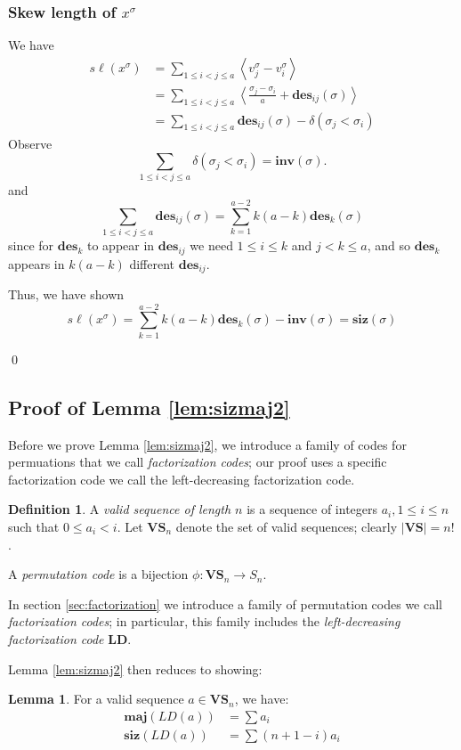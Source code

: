 \documentclass{amsart}[12pt]
\theoremstyle{definition}
\newtheorem{lemma}[dummy]{Lemma}
\newtheorem{definition}[dummy]{Definition}
\newcommand{\sk}{s\ell}
\newcommand{\inv}{\mathbf{inv}}
\newcommand{\des}{\mathbf{des}}
\newcommand{\maj}{\mathbf{maj}}
\newcommand{\siz}{\mathbf{siz}}
\newcommand{\LD}{\mathbf{LD}}
\newcommand{\VS}{\mathbf{VS}}
\begin{document}
\subsubsection{Skew length of $x^\sigma$}
We have
\begin{align*}
\sk (x^\sigma) &=\sum_{1\leq i <j \leq a} \left\langle v^\sigma_j-v^\sigma_i\right\rangle \\
&=\sum_{1\leq i <j \leq a} \left\langle\frac{\sigma_j-\sigma_i}{a}+\des_{ij}(\sigma)\right\rangle \\
&=\sum_{1\leq i<j\leq a} \des_{ij}(\sigma)-\delta(\sigma_j<\sigma_i)
\end{align*}
Observe
$$\sum_{1\leq i<j\leq a} \delta(\sigma_j<\sigma_i)=\inv(\sigma).$$  
and
$$\sum_{1\leq i<j\leq a} \des_{ij}(\sigma)=\sum_{k=1}^{a-2} k(a-k)\des_k(\sigma)$$
since for $\des_k$ to appear in $\des_{ij}$ we need $1\leq i\leq k$ and $j<k\leq a$, and so $\des_k$ appears in $k(a-k)$ different $\des_{ij}$.

Thus, we have shown
$$\sk(x^\sigma)=\sum_{k=1}^{a-2} k(a-k)\des_k(\sigma)-\inv(\sigma)=\siz(\sigma)$$

\qed

\subsection{Proof of Lemma \ref{lem:sizmaj2}}




Before we prove Lemma \ref{lem:sizmaj2}, we introduce a family of codes for permuations that we call \emph{factorization codes}; our proof uses a specific factorization code we call the left-decreasing factorization code.

\begin{definition}
A \emph{valid sequence of length $n$} is a sequence of integers $a_i, 1\leq i\leq n $ such that $0\leq a_i<i$.  Let $\VS_n$ denote the set of valid sequences; clearly $|\VS|=n!$.

A \emph{permutation code} is a bijection $\phi:\VS_n\to S_n$.
\end{definition}

In section \ref{sec:factorization} we introduce a family of permutation codes we call \emph{factorization codes}; in particular, this family includes the \emph{left-decreasing factorization code} $\LD$.  

Lemma \ref{lem:sizmaj2} then reduces to showing:
\begin{lemma} \label{lem:LDweights}
For a valid sequence $a\in \VS_n$, we have:
\begin{align*}
\maj(LD(a))&=\sum a_i \\
\siz(LD(a))&=\sum (n+1-i) a_i
\end{align*}
\end{lemma}
\end{document}

